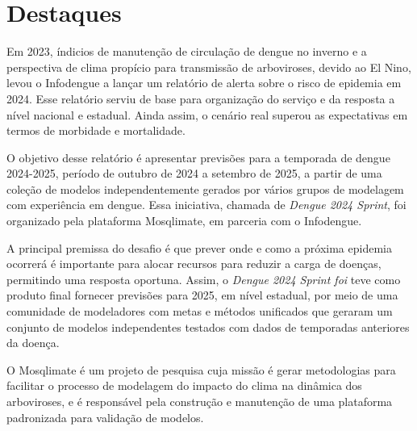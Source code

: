 \section{Destaques}
\begin{tcolorbox}[enhanced,title=Importante]
\end{tcolorbox}

Em 2023, índicios de manutenção de circulação de dengue no inverno e a perspectiva de clima propício para transmissão de arboviroses, devido ao El Nino, levou o Infodengue a lançar um relatório de alerta sobre o risco de epidemia em 2024. Esse relatório serviu de base para organização do serviço e da resposta a nível nacional e estadual. Ainda assim, o cenário real superou as expectativas em termos de morbidade e mortalidade.

O objetivo desse relatório é apresentar previsões para a temporada de dengue 2024-2025, período de outubro de 2024 a setembro de 2025, a partir de uma coleção de modelos independentemente gerados por vários grupos de modelagem com experiência em dengue. Essa iniciativa, chamada de \textit{Dengue 2024 Sprint}, foi organizado pela plataforma Mosqlimate, em parceria com o Infodengue.     

A principal premissa do desafio é que prever onde e como a próxima epidemia ocorrerá é importante para alocar recursos para reduzir a carga de doenças, permitindo uma resposta oportuna. Assim, o \textit{Dengue 2024 Sprint foi } teve como produto final fornecer previsões para 2025, em nível estadual, por meio de uma comunidade de modeladores com metas e métodos unificados que geraram um conjunto de modelos independentes testados com dados de temporadas anteriores da doença. 

O Mosqlimate é um projeto de pesquisa cuja missão é gerar metodologias para facilitar o processo de modelagem do impacto do clima na dinâmica dos arboviroses, e é responsável pela construção e manutenção de uma plataforma padronizada para validação de modelos.  

